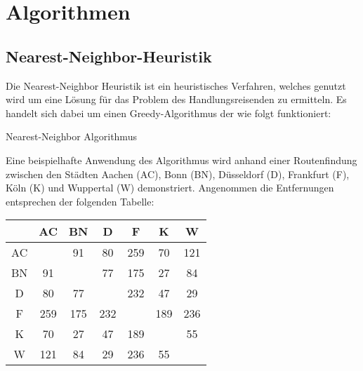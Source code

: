 \documentclass{article}
\begin{document}
%
%
%
\section{Algorithmen}

\subsection{Nearest-Neighbor-Heuristik}

Die Nearest-Neighbor Heuristik ist ein heuristisches Verfahren, welches genutzt wird um eine Lösung für das Problem des Handlungsreisenden zu ermitteln. Es handelt sich dabei um einen Greedy-Algorithmus der wie folgt funktioniert:

\begin{algorithm}
\caption{Nearest-Neighbor Algorithmus}
\end{algorithm}

Eine beispielhafte Anwendung des Algorithmus wird anhand einer Routenfindung zwischen den Städten Aachen (AC), Bonn (BN), Düsseldorf (D), Frankfurt (F), Köln (K) und Wuppertal (W) demonstriert. Angenommen die Entfernungen entsprechen der folgenden Tabelle:

\begin{table}
\centering
\label{tbl:opt-struktur-select-reduktion}
\begin{tabular}{ |c|c|c|c|c|c|c| }
\hline
 & AC & BN & D& F & K & W \\ 
\hline
AC &  & 91 & 80 & 259 & 70 & 121 \\ 
\hline
BN & 91 &  & 77 & 175 & 27 & 84 \\ 
\hline
D & 80 & 77 &  & 232 & 47 & 29 \\ 
\hline
F & 259 & 175 & 232 &  & 189 & 236 \\ 
\hline
K & 70 & 27 & 47 & 189 &  & 55 \\ 
\hline
W & 121 & 84 & 29 & 236 & 55 &  \\ 
\hline
\end{tabular}
\end{table}
\end{document}
